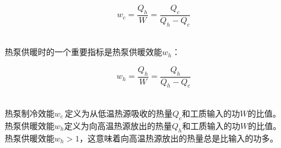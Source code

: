\documentclass[UTF8]{ctexart}
\begin{document}
    \begin{large}
        \begin{equation*}
            w_c=\frac{Q_h}{W}=\frac{Q_c}{Q_h-Q_c}
        \end{equation*}
    \end{large}\\
    热泵供暖时的一个重要指标是热泵供暖效能$w_h$：
    \begin{large}
        \begin{equation*}
            w_h=\frac{Q_h}{W}=\frac{Q_h}{Q_h-Q_c}
        \end{equation*}
    \end{large}\\
    热泵制冷效能$w_c\,$定义为从低温热源吸收的热量$Q_c$和工质输入的功$W$的比值。\\[3mm]
    热泵供暖效能$w_h$定义为向高温热源放出的热量$Q_h$和工质输入的功$W$的比值。\\[3mm]    
    热泵供暖效能$w_h>1$，这意味着向高温热源放出的热量总是比输入的功多。
\end{document}
